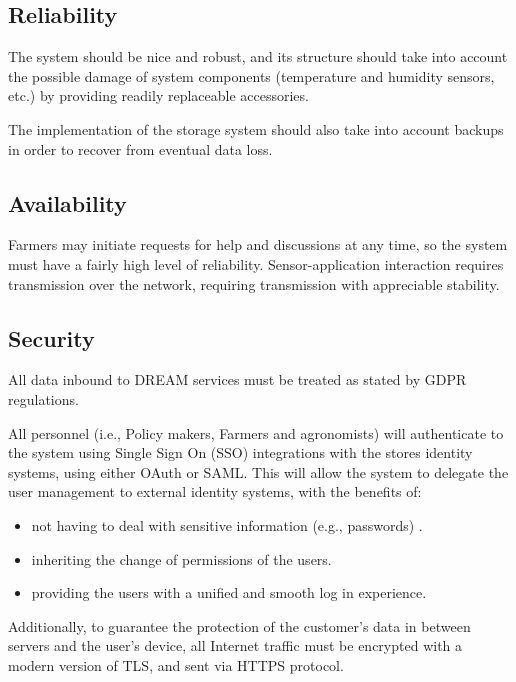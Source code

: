 \documentclass[../../main.tex]{subfiles}
\begin{document}
	\subsection{Reliability}

	The system should be nice and robust, and its structure should take into account the possible damage of system components (temperature and humidity sensors, etc.) by providing readily replaceable accessories.

    The implementation of the storage system should also take into account backups in order to recover from eventual data loss.

	\subsection{Availability}

	Farmers may initiate requests for help and discussions at any time, so the system must have a fairly high level of reliability. Sensor-application interaction requires transmission over the network, requiring transmission with appreciable stability.

	\subsection{Security}

	All data inbound to DREAM services must be treated as stated by GDPR regulations. 

	All personnel (i.e., Policy makers, Farmers and agronomists) will authenticate to the system using Single Sign On (SSO) integrations with the stores identity systems, using either OAuth or SAML. This will allow the system to delegate the user management to external identity systems, with the benefits of:
	\begin{itemize}
		\item not having to deal with sensitive information (e.g., passwords) .\\
		\item inheriting the change of permissions of the users. \\
		\item providing the users with a unified and smooth log in experience.
	\end{itemize}

	Additionally, to guarantee the protection of the customer's data in between servers and the 
	user's device, all Internet traffic must be encrypted with a modern version of TLS, and sent via HTTPS protocol.
\end{document}
